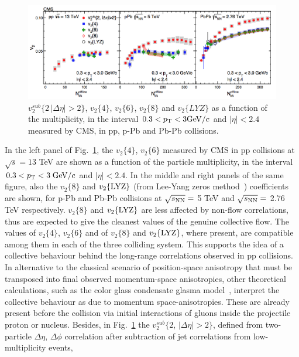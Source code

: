\begin{figure}[!ht]
  \centering
  \includegraphics[width=15cm]{FigCap1/v2CumulantsCMS.png}
  \caption{$v_2^{sub} \{2\, |\Delta \eta| > 2\}$, $v_2 \{4\}$, $v_2 \{6\}$, $v_2 \{8\}$ 
  and $v_2 \{LYZ\}$ as a function of the multiplicity, 
  in the interval $0.3 < p_{\rm T} < 3 \mathrm{GeV}/c$ and $|\eta| < 2.4$~\cite{Khachatryan:2016txc} measured by CMS, in pp, p-Pb and Pb-Pb collisions.}
  \label{fig:CumulantsCMS}
\end{figure}
In the left panel of Fig.~\ref{fig:CumulantsCMS}, the $v_2 \{4\}$, $v_2 \{6\}$
measured by CMS in pp collisions at $\sqrt{s} = 13$ TeV are shown as a 
function of the particle multiplicity, in the interval $0.3 < p_{\rm T} < 3 \; \mathrm{GeV}/c$ and 
$|\eta| < 2.4$. In the middle and right panels of the same figure, also the $v_2 \{8\}$ and $v_2 \{ {\rm LYZ} \}$ 
(from Lee-Yang zeros method~\cite{Bhalerao:2003yq}) coefficients are shown, for p-Pb and Pb-Pb collisions
at $\sqrt{s_{\rm NN}} = $ 5 TeV and $\sqrt{s_{\rm NN}} = $ 2.76 TeV respectively.
$v_2 \{8\}$ and $v_2 \{ {\rm LYZ} \}$ are less affected by non-flow correlations, 
thus are expected to give the 
cleanest values of the genuine collective flow.
The values of $v_2 \{4\}$, $v_2 \{6\}$ and of $v_2 \{8\}$ and  $v_2 \{ {\rm LYZ} \}$, where present, are compatible among 
them in each of the three colliding system. This supports the idea 
of a collective behaviour behind the long-range correlations observed in pp 
collisions. In alternative to the classical scenario of position-space
anisotropy that must be transposed into final observed momentum-space anisotropies, other theoretical 
calculations, such as the color glass condensate glasma model~\cite{Schenke:2016ksl}, 
interpret the collective behaviour as due to momentum space-anisotropies. These are
already present before the collision via initial interactions of gluons inside the projectile proton or
nucleus. Besides, in Fig.~\ref{fig:CumulantsCMS} the 
$v_2^{sub} \{2$, $|\Delta \eta| > 2\}$, defined from two-particle 
$\Delta \eta$, $\Delta \phi$ correlation after subtraction of jet correlations from low-multiplicity events, 

